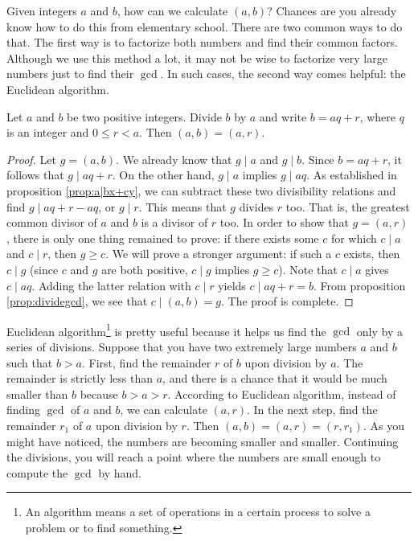 Given integers $a$ and $b$, how can we calculate $(a,b)$? Chances are you already know how to do this from elementary school. There are two common ways to do that. The first way is to factorize both numbers and find their common factors. Although we use this method a lot, it may not be wise to factorize very large numbers just to find their $\gcd$. In such cases, the second way comes helpful: the Euclidean algorithm.

\begin{theorem}
	Let $a$ and $b$ be two positive integers. Divide $b$ by $a$ and write $b=aq+r$, where $q$ is an integer and $0\leq r<a$. Then $(a,b)=(a,r)$.
\end{theorem}

\begin{proof}
	Let $g= (a,b)$. We already know that $g\mid a$ and $g\mid b$. Since $b=aq+r$, it follows that $g\mid aq+r$. On the other hand, $g\mid a$ implies $g\mid aq$. As established in proposition \eqref{prop:a|bx+cy}, we can subtract these two divisibility relations and find $g\mid aq+r-aq$, or $g\mid r$. This means that $g$ divides $r$ too. That is, the greatest common divisor of $a$ and $b$ is a divisor of $r$ too. In order to show that $g=(a,r)$, there is only one thing remained to prove: if there exists some $c$ for which $c\mid a$ and $c\mid r$, then $g \geq c$. We will prove a stronger argument: if such a $c$ exists, then $c\mid g$ (since $c$ and $g$ are both positive, $c\mid g$ implies $g \geq c$). Note that $c\mid a$ gives $c\mid aq$. Adding the latter relation with $c\mid r$ yields $c\mid aq+r = b$. From proposition \eqref{prop:dividegcd}, we see that $c\mid (a,b)=g$. The proof is complete.
\end{proof}

Euclidean algorithm\footnote{An algorithm means a set of operations in a certain process to solve a problem or to find something.} is pretty useful because it helps us find the $\gcd$ only by a series of divisions. Suppose that you have two extremely large numbers $a$ and $b$ such that $b>a$. First, find the remainder $r$ of $b$ upon division by $a$. The remainder is strictly less than $a$, and there is a chance that it would be much smaller than $b$ because $b>a>r$. According to Euclidean algorithm, instead of finding $\gcd$ of $a$ and $b$, we can calculate $(a,r)$. In the next step, find the remainder $r_1$ of $a$ upon division by $r$. Then $(a,b)=(a,r)=(r,r_1)$. As you might have noticed, the numbers are becoming smaller and smaller. Continuing the divisions, you will reach a point where the numbers are small enough to compute the $\gcd$ by hand.


